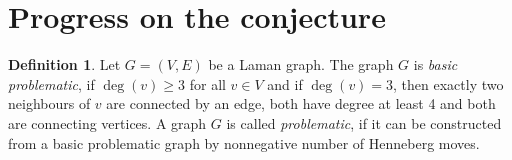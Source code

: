 \documentclass[a4paper, 11pt]{article}
\theoremstyle{definition}
\newtheorem{defn}{Definition}[section]
\begin{document}
\section{Progress on the conjecture}
\begin{defn}
Let $G=(V,E)$ be a Laman graph. The graph $G$ is \textit{basic problematic}, if $\deg(v)\geq 3$ for all $v\in V$ and if $\deg(v) =3$, then exactly two neighbours of $v$ are connected by an edge, both have degree at least 4 and both are connecting vertices.
A graph $G$ is called \emph{problematic}, if it can be constructed from a basic problematic graph by nonnegative number of Henneberg moves.%
\end{defn}
\end{document}

